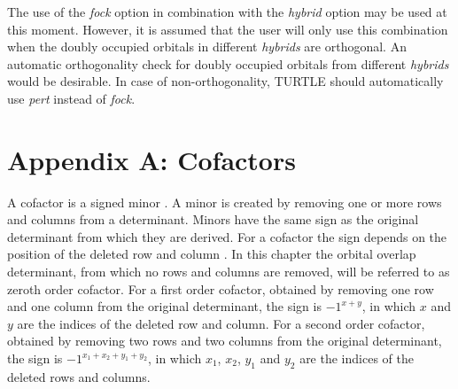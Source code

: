 The use of the \textit{fock} option in combination with the \textit{hybrid} option may be used at this moment. However, it is assumed that the user will only use this combination when the doubly occupied orbitals in different \textit{hybrids} are orthogonal. An automatic orthogonality check for doubly occupied orbitals from different \textit{hybrids} would be desirable. In case of non-orthogonality, TURTLE should automatically use \textit{pert} instead of \textit{fock}. 

\section*{Appendix A: Cofactors}

A cofactor is a signed minor \cite{aitken}. A minor is created by removing one or more rows and columns from a determinant. Minors have the same sign as the original determinant from which they are derived. For a cofactor the sign depends on the position of the deleted row and column \cite{fokkeproef}. In this chapter the orbital overlap determinant, from which no rows and columns are removed, will be referred to as zeroth order cofactor. For a first order cofactor, obtained by removing one row and one column from the original determinant, the sign is $-1^{x+y}$, in which $x$ and $y$ are the indices of the deleted row and column. For a second order cofactor, obtained by removing two rows and two columns from the original determinant, the sign is $-1^{x_1+x_2+y_1+y_2}$, in which $x_1$, $x_2$, $y_1$ and $y_2$ are the indices of the deleted rows and columns. 

